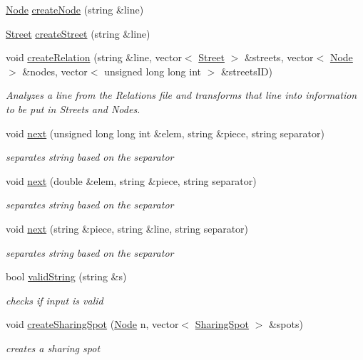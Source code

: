 \begin{DoxyCompactItemize}
\mbox{\hyperlink{class_node}{Node}} \mbox{\hyperlink{class_parser_a69118b5346049a40a31eabcdbdbe1d4f}{create\+Node}} (string \&line)
\item 
\mbox{\hyperlink{class_street}{Street}} \mbox{\hyperlink{class_parser_a32dd986c0abb09bb1aaeb9683d3df616}{create\+Street}} (string \&line)
\item 
void \mbox{\hyperlink{class_parser_abc6f5fd0f2bf4a8ecca4b23c4a84d168}{create\+Relation}} (string \&line, vector$<$ \mbox{\hyperlink{class_street}{Street}} $>$ \&streets, vector$<$ \mbox{\hyperlink{class_node}{Node}} $>$ \&nodes, vector$<$ unsigned long long int $>$ \&streets\+ID)
\begin{DoxyCompactList}\small\item\em Analyzes a line from the Relations file and transforms that line into information to be put in Streets and Nodes. \end{DoxyCompactList}\item 
void \mbox{\hyperlink{class_parser_a4cd265d02c182e14a071407408468af0}{next}} (unsigned long long int \&elem, string \&piece, string separator)
\begin{DoxyCompactList}\small\item\em separates string based on the separator \end{DoxyCompactList}\item 
void \mbox{\hyperlink{class_parser_af2f740981e70de7602e8c2bcb3db904e}{next}} (double \&elem, string \&piece, string separator)
\begin{DoxyCompactList}\small\item\em separates string based on the separator \end{DoxyCompactList}\item 
void \mbox{\hyperlink{class_parser_a143c7f81ca7d3fb0a4013f8821126e0f}{next}} (string \&piece, string \&line, string separator)
\begin{DoxyCompactList}\small\item\em separates string based on the separator \end{DoxyCompactList}\item 
bool \mbox{\hyperlink{class_parser_ac49eaa953c8f063c8a3119b36df32c90}{valid\+String}} (string \&s)
\begin{DoxyCompactList}\small\item\em checks if input is valid \end{DoxyCompactList}\item 
void \mbox{\hyperlink{class_parser_a9b8221457783a9669e14ba266d976f6e}{create\+Sharing\+Spot}} (\mbox{\hyperlink{class_node}{Node}} n, vector$<$ \mbox{\hyperlink{class_sharing_spot}{Sharing\+Spot}} $>$ \&spots)
\begin{DoxyCompactList}\small\item\em creates a sharing spot \end{DoxyCompactList}\end{DoxyCompactItemize}


